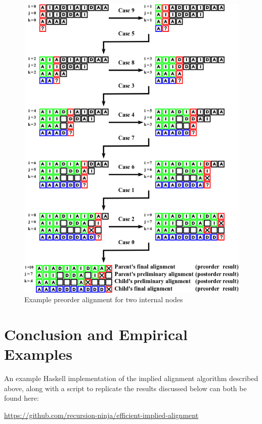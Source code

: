 \documentclass[11pt]{article}
\begin{document}
\begin{figure}[h]
	\caption{Example preorder alignment for two internal nodes}
	\label{Fig:ExamplePreorder}
	\vspace{2ex}
	\includegraphics{example-preorder.png}
\end{figure}

\restoregeometry

\section{Conclusion and Empirical Examples}

An example Haskell implementation of the implied alignment algorithm described above, along with a script to replicate the results discussed below can both be found here: 

\centerline{\url{https://github.com/recursion-ninja/efficient-implied-alignment}}
\end{document}
